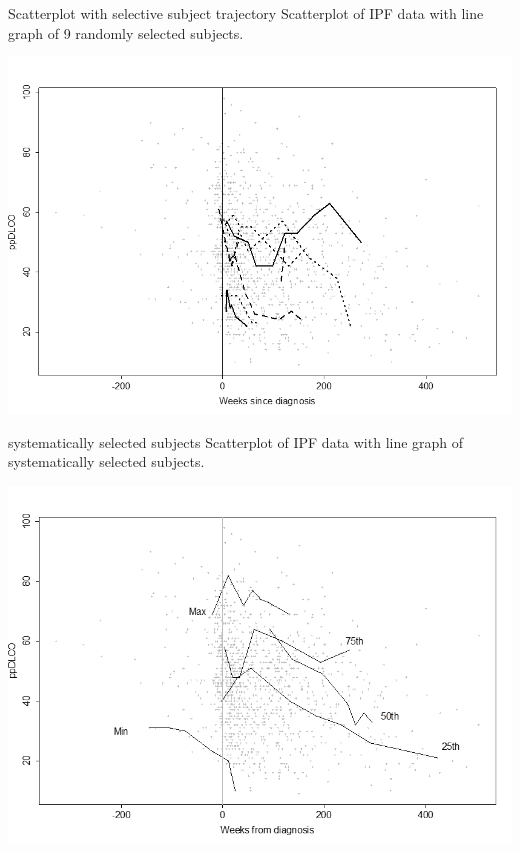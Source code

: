 \documentclass[
  9pt,
  ignorenonframetext,
]{beamer}
\begin{document}
\begin{frame}{Scatterplot with selective subject trajectory}
\protect\hypertarget{scatterplot-with-selective-subject-trajectory}{}
Scatterplot of IPF data with line graph of 9 randomly selected subjects.

\tiny

\begin{center}\includegraphics[width=0.6\linewidth]{figs_L2/L2-f6} \end{center}

\tiny
\end{frame}

\begin{frame}{systematically selected subjects}
\protect\hypertarget{systematically-selected-subjects}{}
Scatterplot of IPF data with line graph of systematically selected
subjects.

\tiny

\begin{center}\includegraphics[width=0.6\linewidth]{figs_L2/L2-f7} \end{center}

\tiny
\end{frame}
\end{document}
